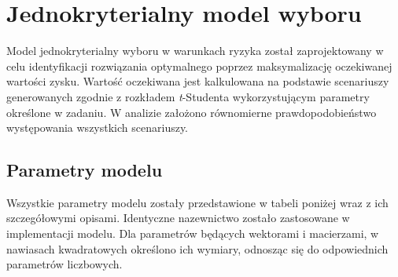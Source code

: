 \documentclass[11pt,a4paper]{article}
\begin{document}
\section{Jednokryterialny model wyboru}
Model jednokryterialny wyboru w warunkach ryzyka został zaprojektowany w celu identyfikacji rozwiązania 
optymalnego poprzez maksymalizację oczekiwanej wartości zysku. Wartość oczekiwana jest kalkulowana na 
podstawie scenariuszy generowanych zgodnie z rozkładem \textit{t}-Studenta wykorzystującym parametry 
określone w zadaniu. W analizie założono równomierne prawdopodobieństwo występowania wszystkich 
scenariuszy.
\subsection{Parametry modelu}
Wszystkie parametry modelu zostały przedstawione w tabeli poniżej wraz z ich szczegółowymi opisami. 
Identyczne nazewnictwo zostało zastosowane w implementacji modelu. Dla parametrów będących wektorami 
i macierzami, w nawiasach kwadratowych określono ich wymiary, odnosząc się do odpowiednich parametrów liczbowych.
\end{document}
